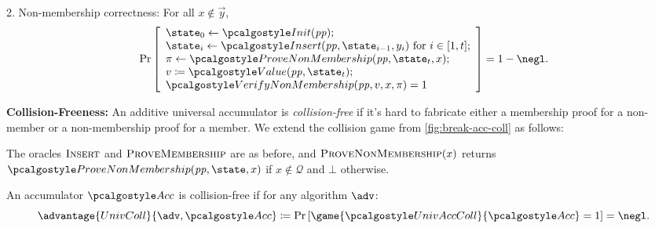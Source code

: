 \begin{mysolution}
  2. Non-membership correctness: For all $x \notin \vec{y}$,
  \[
    \Pr\left[
    \begin{array}{l}
      \state_0 \gets \algo{Init}(\params); \\
      \state_i \gets \algo{Insert}(\params, \state_{i-1}, y_i) \text{ for } i \in [1, t]; \\
      \pi \gets \algo{ProveNonMembership}(\params, \state_t, x); \\
      v \defeq \algo{Value}(\params, \state_t); \\
      \algo{VerifyNonMembership}(\params, v, x, \pi) = 1
    \end{array}
    \right] = 1 - \negl.
  \]
  
  \textbf{Collision-Freeness:} An additive universal accumulator is \emph{collision-free} if it's hard to fabricate either a membership proof for a non-member or a non-membership proof for a member.
  We extend the collision game from \autoref{fig:break-acc-coll} as follows:
  
  \begin{center}
    \begin{tcolorbox}[width=13cm]
      \begin{pcvstack}[center]
      \end{pcvstack}
    \end{tcolorbox}
  \end{center}
  
  The oracles ${\normalfont\textsc{Insert}}$ and ${\normalfont\textsc{ProveMembership}}$ are as before, and ${\normalfont\textsc{ProveNonMembership}}(x)$ returns $\algo{ProveNonMembership}(\params, \state, x)$ if $x \notin \mathcal{Q}$ and $\bot$ otherwise.
  
  An accumulator $\algo{Acc}$ is collision-free if for any \ppt algorithm $\adv$:
  \[
    \advantage{UnivColl}{\adv, \algo{Acc}} \defeq \pr{\game{\algo{UnivAccColl}}{\algo{Acc}} = 1} = \negl.
  \]
\end{mysolution}
\fi

